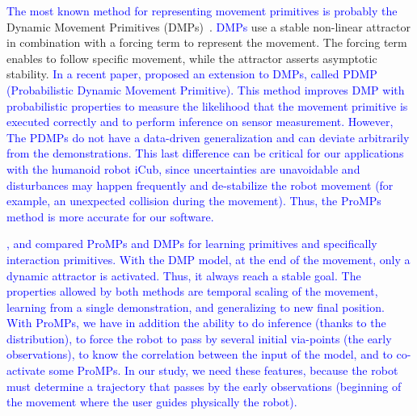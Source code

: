 \documentclass[utf8]{frontiersSCNS} %
\newcommand{\rev}[1]{\textcolor{blue}{#1}}
\newcommand{\todo}[1]{\textcolor{red}{\textbf{/*#1*/}}}
\begin{document}
\rev{The most known method for representing movement primitives is probably the} Dynamic Movement Primitives (DMPs)~\cite{ijspeert2013dynamical,schaal2006dynamic,meier2016probabilistic}. \rev{DMPs} use a stable non-linear attractor in combination with a forcing term to represent the movement. The forcing term enables to follow specific movement, while the attractor asserts asymptotic stability. 
\rev{In a recent paper, \cite{meier2016probabilistic} proposed an extension to DMPs, called PDMP (Probabilistic Dynamic Movement Primitive). This method improves DMP with probabilistic properties to measure the likelihood that the movement primitive is executed correctly and to perform inference on sensor measurement. However, The PDMPs do not have a data-driven generalization and can deviate arbitrarily from the demonstrations. This last difference can be critical for our applications with the humanoid robot iCub, since uncertainties are unavoidable and disturbances may happen frequently and de-stabilize the robot movement (for example, an unexpected collision during the movement). Thus, the ProMPs method is more accurate for our software.}



\rev{\cite{ewerton2015learning}, \cite{paraschos2013probabilisticTrajectory} and \cite{maeda2014learning} 
compared ProMPs and DMPs for learning primitives and specifically interaction primitives. With the DMP model, at the end of the movement, only a dynamic attractor is activated. Thus, it always reach a stable goal. 
The properties allowed by both methods are temporal scaling of the movement, learning from a single demonstration, and generalizing to new final position. 
With ProMPs, we have in addition the ability to do inference (thanks to the distribution), to force the robot to pass by several initial via-points (the early observations), to know the correlation between the input of the model, and to co-activate some ProMPs. 
In our study, we need these features, because the robot must determine a trajectory that passes by the early observations (beginning of the movement where the user guides physically the robot). 
}
\end{document}
